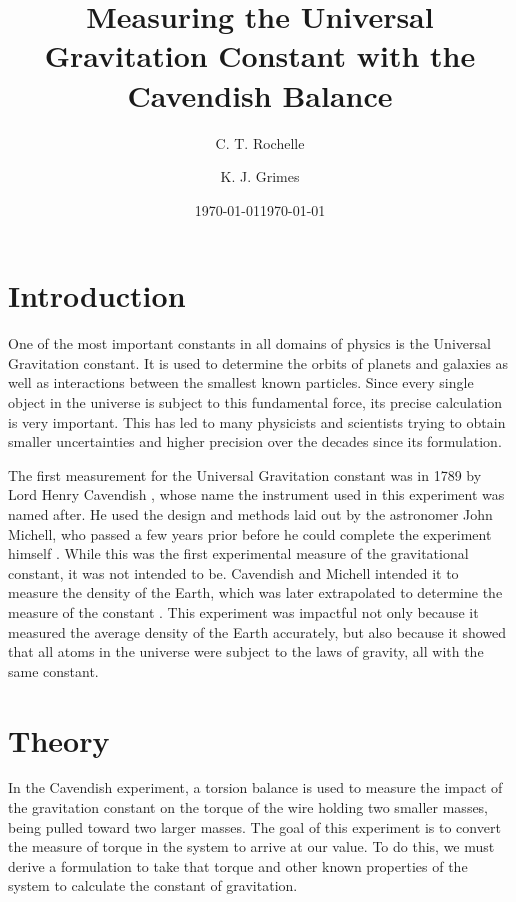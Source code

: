 \documentclass[aps,prl,10pt,twocolumn,floatfix]{revtex4-2}
\begin{document}


\title{Measuring the Universal Gravitation Constant with the Cavendish Balance}
\author{C. T. Rochelle}
\author{K. J. Grimes}
\date{\today}
\date{\today}

\maketitle

\section{Introduction}\label{Intro}
One of the most important constants in all domains of physics is the Universal Gravitation constant. 
It is used to determine the orbits of planets and galaxies as well as interactions between the smallest known particles.
Since every single object in the universe is subject to this fundamental force, its precise calculation is very important.
This has led to many physicists and scientists trying to obtain smaller uncertainties and higher precision over the decades since its formulation. 

The first measurement for the Universal Gravitation constant was in 1789 by Lord Henry Cavendish \cite{class}, whose name the instrument used in this experiment was named after. 
He used the design and methods laid out by the astronomer John Michell, who passed a few years prior before he could complete the experiment himself \cite{birtanica}. 
While this was the first experimental measure of the gravitational constant, it was not intended to be. 
Cavendish and Michell intended it to measure the density of the Earth, which was later extrapolated to determine the measure of the constant \cite{britanica}.
This experiment was impactful not only because it measured the average density of the Earth accurately, but also because it showed that all atoms in the universe were subject to the laws of gravity, all with the same constant. 

\section{Theory}\label{Theory}
In the Cavendish experiment, a torsion balance is used to measure the impact of the gravitation constant on the torque of the wire holding two smaller masses, being pulled toward two larger masses. 
The goal of this experiment is to convert the measure of torque in the system to arrive at our value. 
To do this, we must derive a formulation to take that torque and other known properties of the system to calculate the constant of gravitation. 
\end{document}
